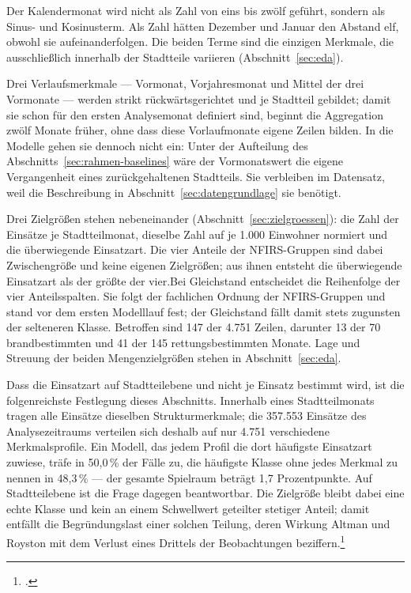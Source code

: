 \documentclass[12pt,a4paper]{article}
\begin{document}
Der Kalendermonat wird nicht als Zahl von eins bis zwölf geführt, sondern als
Sinus- und Kosinusterm. Als Zahl hätten Dezember und Januar den Abstand elf,
obwohl sie aufeinanderfolgen. Die beiden Terme sind die einzigen Merkmale, die
ausschließlich innerhalb der Stadtteile variieren (Abschnitt~\ref{sec:eda}).
 
Drei Verlaufsmerkmale --- Vormonat, Vorjahresmonat und Mittel der drei
Vormonate --- werden strikt rückwärtsgerichtet und je Stadtteil gebildet; damit
sie schon für den ersten Analysemonat definiert sind, beginnt die Aggregation
zwölf Monate früher, ohne dass diese Vorlaufmonate eigene Zeilen bilden. In die
Modelle gehen sie dennoch nicht ein: Unter der Aufteilung des
Abschnitts~\ref{sec:rahmen-baselines} wäre der Vormonatswert die eigene
Vergangenheit eines zurückgehaltenen Stadtteils. Sie verbleiben im Datensatz,
weil die Beschreibung in Abschnitt~\ref{sec:datengrundlage} sie benötigt.
 
Drei Zielgrößen stehen nebeneinander (Abschnitt~\ref{sec:zielgroessen}): die
Zahl der Einsätze je Stadtteilmonat, dieselbe Zahl auf je 1.000 Einwohner
normiert und die überwiegende Einsatzart. Die vier Anteile der NFIRS-Gruppen
sind dabei Zwischengröße und keine eigenen Zielgrößen; aus ihnen entsteht die
überwiegende Einsatzart als der größte der vier.Bei Gleichstand entscheidet die Reihenfolge der vier Anteilsspalten. Sie folgt der fachlichen Ordnung der NFIRS-Gruppen und stand vor dem ersten Modelllauf fest; der Gleichstand fällt damit stets zugunsten der selteneren Klasse. Betroffen sind 147 der 4.751 Zeilen, darunter 13 der 70 brandbestimmten und 41 der 145 rettungsbestimmten Monate. Lage und Streuung der beiden
Mengenzielgrößen stehen in Abschnitt~\ref{sec:eda}.
 
Dass die Einsatzart auf Stadtteilebene und nicht je Einsatz bestimmt wird, ist
die folgenreichste Festlegung dieses Abschnitts. Innerhalb eines
Stadtteilmonats tragen alle Einsätze dieselben Strukturmerkmale; die 357.553
Einsätze des Analysezeitraums verteilen sich deshalb auf nur 4.751 verschiedene
Merkmalsprofile. Ein Modell, das jedem Profil die dort häufigste Einsatzart
zuwiese, träfe in 50,0\,\% der Fälle zu, die häufigste Klasse ohne jedes
Merkmal zu nennen in 48,3\,\% --- der gesamte Spielraum beträgt 1,7
Prozentpunkte. Auf Stadtteilebene ist die Frage dagegen beantwortbar. Die
Zielgröße bleibt dabei eine echte Klasse und kein an einem Schwellwert
geteilter stetiger Anteil; damit entfällt die Begründungslast einer solchen
Teilung, deren Wirkung Altman und Royston mit dem Verlust eines Drittels der
Beobachtungen beziffern.\footcite{Altman2006}
 
\end{document}
